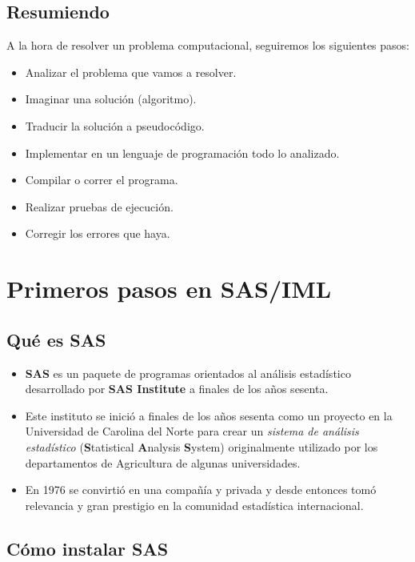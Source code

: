 \documentclass[]{book}
\providecommand{\tightlist}{%
  \setlength{\itemsep}{0pt}\setlength{\parskip}{0pt}}
\begin{document}
\section{Resumiendo}\label{resumiendo}

A la hora de resolver un problema computacional, seguiremos los
siguientes pasos:

\begin{itemize}
\tightlist
\item
  Analizar el problema que vamos a resolver.
\item
  Imaginar una solución (algoritmo).
\item
  Traducir la solución a pseudocódigo.
\item
  Implementar en un lenguaje de programación todo lo analizado.
\item
  Compilar o correr el programa.
\item
  Realizar pruebas de ejecución.
\item
  Corregir los errores que haya.
\end{itemize}

\chapter{Primeros pasos en SAS/IML}\label{primeros-pasos-en-sasiml}

\section{Qué es SAS}\label{que-es-sas}

\begin{itemize}
\tightlist
\item
  \textbf{SAS} es un paquete de programas orientados al análisis
  estadístico desarrollado por \textbf{SAS Institute} a finales de los
  años sesenta.
\item
  Este instituto se inició a finales de los años sesenta como un
  proyecto en la Universidad de Carolina del Norte para crear un
  \emph{sistema de análisis estadístico} (\textbf{S}tatistical
  \textbf{A}nalysis \textbf{S}ystem) originalmente utilizado por los
  departamentos de Agricultura de algunas universidades.
\item
  En 1976 se convirtió en una compañía y privada y desde entonces tomó
  relevancia y gran prestigio en la comunidad estadística internacional.
\end{itemize}

\section{Cómo instalar SAS}\label{como-instalar-sas}
\end{document}
